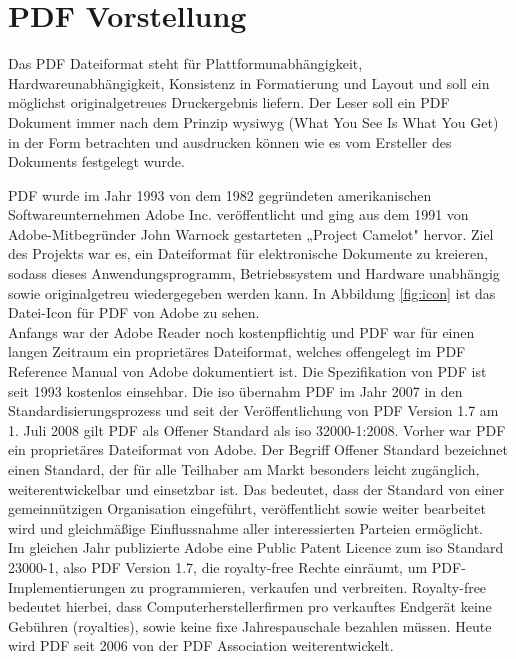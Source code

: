 \section{PDF Vorstellung}
Das PDF Dateiformat steht für Plattformunabhängigkeit, Hardwareunabhängigkeit, Konsistenz in Formatierung und Layout und soll ein möglichst originalgetreues Druckergebnis liefern. Der Leser soll ein PDF Dokument immer nach dem Prinzip \gls{wysiwyg} (What You See Is What You Get) in der Form betrachten und ausdrucken können wie es vom Ersteller des Dokuments festgelegt wurde.
\par
PDF wurde im Jahr 1993 von dem 1982 gegründeten amerikanischen Softwareunternehmen Adobe Inc. veröffentlicht und ging aus dem 1991 von Adobe-Mitbegründer John Warnock gestarteten „Project Camelot" hervor. \cite{wiki-adobe, wiki-pdf-de} Ziel des Projekts war es, ein Dateiformat für elektronische Dokumente zu kreieren, sodass dieses Anwendungsprogramm, Betriebssystem und Hardware unabhängig sowie originalgetreu wiedergegeben werden kann. In Abbildung \ref{fig:icon} ist das Datei-Icon für PDF von Adobe zu sehen. \\
Anfangs war der Adobe Reader noch kostenpflichtig und PDF war für einen langen Zeitraum ein proprietäres Dateiformat, welches offengelegt im PDF Reference Manual von Adobe dokumentiert ist. Die Spezifikation von PDF ist seit 1993 kostenlos einsehbar. \cite{wiki-pdf-engl} Die \gls{iso} übernahm PDF im Jahr 2007 in den Standardisierungsprozess und seit der Veröffentlichung von PDF Version 1.7 am 1. Juli 2008 gilt PDF als Offener Standard als \gls{iso} 32000-1:2008. \cite{wiki-pdf-de, wiki-pdf-engl} Vorher war PDF ein proprietäres Dateiformat von Adobe. Der Begriff Offener Standard bezeichnet einen Standard, der für alle Teilhaber am Markt besonders leicht zugänglich, weiterentwickelbar und einsetzbar ist. Das bedeutet, dass der Standard von einer gemeinnützigen Organisation eingeführt, veröffentlicht sowie weiter bearbeitet wird und gleichmäßige Einflussnahme aller interessierten Parteien ermöglicht. \cite{wiki-standard} \\
Im gleichen Jahr publizierte Adobe eine Public Patent Licence zum \gls{iso} Standard 23000-1, also PDF Version 1.7, die royalty-free Rechte einräumt, um PDF-Implementierungen zu programmieren, verkaufen und verbreiten. \cite{wiki-pdf-engl} Royalty-free bedeutet hierbei, dass Computerherstellerfirmen pro verkauftes Endgerät keine Gebühren (royalties), sowie keine fixe Jahrespauschale bezahlen müssen. \cite{wiki-roy-free} Heute wird PDF seit 2006 von der PDF Association weiterentwickelt. \cite{wiki-pdf-de}


